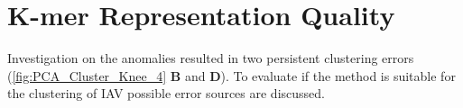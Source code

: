 \section{K-mer Representation Quality} \label{sec:K_mer_Representation}

Investigation on the anomalies resulted in two persistent clustering errors (\autoref{fig:PCA_Cluster_Knee_4} \textbf{\textsf{B}} and \textbf{\textsf{D}}). To evaluate if the method is suitable for the clustering of \gls{IAV} possible error sources are discussed.




